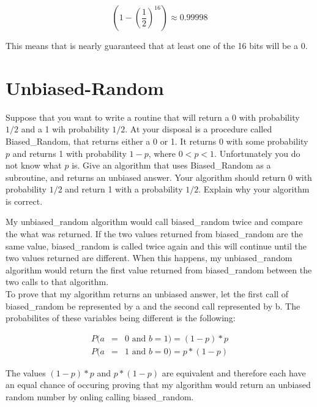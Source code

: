 \documentclass[11pt]{article}
\begin{document}
\begin{equation*}
(1-(\frac{1}{2})^{16}) \approx 0.99998
\end{equation*}

This means that is nearly guaranteed that at least one of the 16 bits will be a 0.





\section{Unbiased-Random}%
Suppose that you want to write a routine that will return a 0 with probability $1/2$ and a 1 wih probability $1/2$. At your disposal is a procedure called Biased\_Random, that returns either a 0 or 1. It returns 0 with some probability $p$ and returns 1 with probability $1-p$, where $0<p<1$. Unfortunately you do not know what $p$ is. Give an algorithm that uses Biased\_Random as a subroutine, and returns an unbiased answer. Your algorithm should return 0 with probability $1/2$ and return 1 with a probability $1/2$. Explain why your algorithm is correct.

\bigskip
\bigskip

My unbiased\_random algorithm would call biased\_random twice and compare the what was returned. If the two values returned from biased\_random are the same value, biased\_random is called twice again and this will continue until the two values returned are different. When this happens, my unbiased\_random algorithm would return the first value returned from biased\_random between the two calls to that algorithm.\\
To prove that my algorithm returns an unbiased answer, let the first call of biased\_random be represented by a and the second call represented by b. The probabilites of these variables being different is the following:

\begin{eqnarray*}
P(a&=&0 \text{ and } b=1) = (1-p)*p \\
P(a&=&1 \text{ and } b=0) = p*(1-p)
\end{eqnarray*}

\noindent The values $(1-p)*p$ and $p*(1-p)$ are equivalent and therefore each have an equal chance of occuring proving that my algorithm would return an unbiased random number by onling calling biased\_random.


























\end{document}
